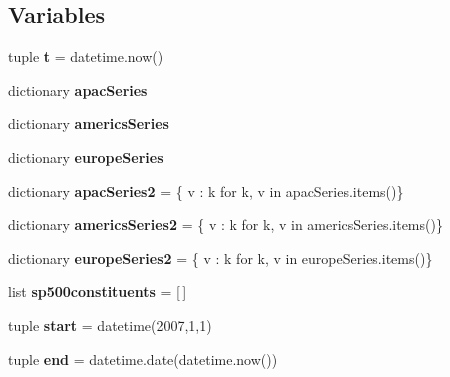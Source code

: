 \subsection*{\-Variables}
\begin{DoxyCompactItemize}
\item 
\hypertarget{namespaceDataDownLoader_1_1ImportDataPandas_afcd1eb85df3ec753c659520660771a1e}{tuple {\bfseries t} = datetime.\-now()}\label{namespaceDataDownLoader_1_1ImportDataPandas_afcd1eb85df3ec753c659520660771a1e}

\item 
dictionary {\bfseries apac\-Series}
\item 
dictionary {\bfseries americs\-Series}
\item 
dictionary {\bfseries europe\-Series}
\item 
\hypertarget{namespaceDataDownLoader_1_1ImportDataPandas_a5dfdfdddf89c6413041d1ef8a438c53c}{dictionary {\bfseries apac\-Series2} = \{ v \-: k for k, v in apac\-Series.\-items()\}}\label{namespaceDataDownLoader_1_1ImportDataPandas_a5dfdfdddf89c6413041d1ef8a438c53c}

\item 
\hypertarget{namespaceDataDownLoader_1_1ImportDataPandas_abb78857642d8b684a79803998cd0cf92}{dictionary {\bfseries americs\-Series2} = \{ v \-: k for k, v in americs\-Series.\-items()\}}\label{namespaceDataDownLoader_1_1ImportDataPandas_abb78857642d8b684a79803998cd0cf92}

\item 
\hypertarget{namespaceDataDownLoader_1_1ImportDataPandas_a346a40f93e217927c991544f0bf728af}{dictionary {\bfseries europe\-Series2} = \{ v \-: k for k, v in europe\-Series.\-items()\}}\label{namespaceDataDownLoader_1_1ImportDataPandas_a346a40f93e217927c991544f0bf728af}

\item 
\hypertarget{namespaceDataDownLoader_1_1ImportDataPandas_aaf861cd5dd5894e2563972c425754951}{list {\bfseries sp500constituents} = \mbox{[}$\,$\mbox{]}}\label{namespaceDataDownLoader_1_1ImportDataPandas_aaf861cd5dd5894e2563972c425754951}

\item 
\hypertarget{namespaceDataDownLoader_1_1ImportDataPandas_a98e2474ce6a8c32810559da6c911eeae}{tuple {\bfseries start} = datetime(2007,1,1)}\label{namespaceDataDownLoader_1_1ImportDataPandas_a98e2474ce6a8c32810559da6c911eeae}

\item 
\hypertarget{namespaceDataDownLoader_1_1ImportDataPandas_a187f8e2194f06be32ad98fcb04e4c32f}{tuple {\bfseries end} = datetime.\-date(datetime.\-now())}\label{namespaceDataDownLoader_1_1ImportDataPandas_a187f8e2194f06be32ad98fcb04e4c32f}


\end{DoxyCompactItemize}
